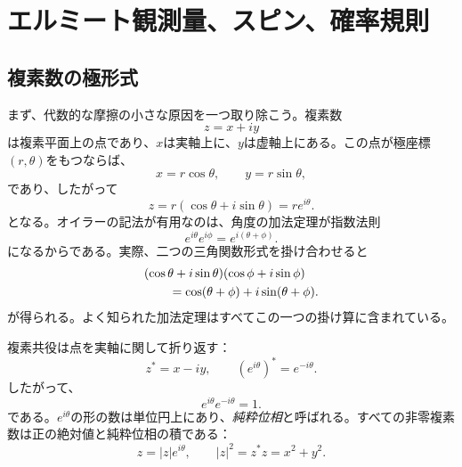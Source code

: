 \chapter{エルミート観測量、スピン、確率規則}


\section{複素数の極形式}

まず、代数的な摩擦の小さな原因を一つ取り除こう。複素数
\begin{equation}
  z=x+iy
\end{equation}
は複素平面上の点であり、\(x\)は実軸上に、\(y\)は虚軸上にある。この点が極座標\((r,\theta)\)をもつならば、
\begin{equation}
  x=r\cos\theta,
  \qquad
  y=r\sin\theta,
\end{equation}
であり、したがって
\begin{equation}
  z=r(\cos\theta+i\sin\theta)=re^{i\theta}.
  \label{eq:l03-polar-form}
\end{equation}
となる。オイラーの記法が有用なのは、角度の加法定理が指数法則
\begin{equation}
  e^{i\theta}e^{i\phi}
  =e^{i(\theta+\phi)}.
  \label{eq:l03-phase-product}
\end{equation}
になるからである。実際、二つの三角関数形式を掛け合わせると
\begin{align}
& (\cos\theta+i\sin\theta)(\cos\phi+i\sin\phi)
\notag\\
&\qquad=\cos(\theta+\phi)+i\sin(\theta+\phi).
\end{align}
が得られる。よく知られた加法定理はすべてこの一つの掛け算に含まれている。

複素共役は点を実軸に関して折り返す：
\begin{equation}
  z^*=x-iy,
  \qquad
  (e^{i\theta})^*=e^{-i\theta}.
\end{equation}
したがって、
\begin{equation}
  e^{i\theta}e^{-i\theta}=1.
\end{equation}
である。\(e^{i\theta}\)の形の数は単位円上にあり、\emph{純粋位相}と呼ばれる。すべての非零複素数は正の絶対値と純粋位相の積である：
\begin{equation}
  z=|z|e^{i\theta},
  \qquad
  |z|^2=z^*z=x^2+y^2.
  \label{eq:l03-modulus-phase}
\end{equation}

